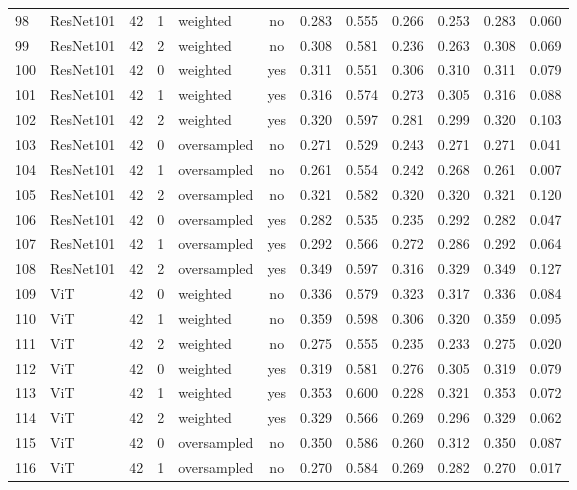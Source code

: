 \documentclass[a4paper,10pt]{book}
\begin{document}
\begin{scriptsize}
\begin{longtable}{@{}l l c c l c c c c c c c@{}}
        98 & ResNet101 & 42 & 1 & weighted & no & 0.283 & 0.555 & 0.266 & 0.253 & 0.283 & 0.060 \\ 
        99 & ResNet101 & 42 & 2 & weighted & no & 0.308 & 0.581 & 0.236 & 0.263 & 0.308 & 0.069 \\ 
        100 & ResNet101 & 42 & 0 & weighted & yes & 0.311 & 0.551 & 0.306 & 0.310 & 0.311 & 0.079 \\ 
        101 & ResNet101 & 42 & 1 & weighted & yes & 0.316 & 0.574 & 0.273 & 0.305 & 0.316 & 0.088 \\ 
        102 & ResNet101 & 42 & 2 & weighted & yes & 0.320 & 0.597 & 0.281 & 0.299 & 0.320 & 0.103 \\ 
        103 & ResNet101 & 42 & 0 & oversampled & no & 0.271 & 0.529 & 0.243 & 0.271 & 0.271 & 0.041 \\ 
        104 & ResNet101 & 42 & 1 & oversampled & no & 0.261 & 0.554 & 0.242 & 0.268 & 0.261 & 0.007 \\ 
        105 & ResNet101 & 42 & 2 & oversampled & no & 0.321 & 0.582 & 0.320 & 0.320 & 0.321 & 0.120 \\ 
        106 & ResNet101 & 42 & 0 & oversampled & yes & 0.282 & 0.535 & 0.235 & 0.292 & 0.282 & 0.047 \\ 
        107 & ResNet101 & 42 & 1 & oversampled & yes & 0.292 & 0.566 & 0.272 & 0.286 & 0.292 & 0.064 \\ 
        108 & ResNet101 & 42 & 2 & oversampled & yes & 0.349 & 0.597 & 0.316 & 0.329 & 0.349 & 0.127 \\ 
        109 & ViT & 42 & 0 & weighted & no & 0.336 & 0.579 & 0.323 & 0.317 & 0.336 & 0.084 \\ 
        110 & ViT & 42 & 1 & weighted & no & 0.359 & 0.598 & 0.306 & 0.320 & 0.359 & 0.095 \\ 
        111 & ViT & 42 & 2 & weighted & no & 0.275 & 0.555 & 0.235 & 0.233 & 0.275 & 0.020 \\ 
        112 & ViT & 42 & 0 & weighted & yes & 0.319 & 0.581 & 0.276 & 0.305 & 0.319 & 0.079 \\ 
        113 & ViT & 42 & 1 & weighted & yes & 0.353 & 0.600 & 0.228 & 0.321 & 0.353 & 0.072 \\ 
        114 & ViT & 42 & 2 & weighted & yes & 0.329 & 0.566 & 0.269 & 0.296 & 0.329 & 0.062 \\ 
        115 & ViT & 42 & 0 & oversampled & no & 0.350 & 0.586 & 0.260 & 0.312 & 0.350 & 0.087 \\ 
        116 & ViT & 42 & 1 & oversampled & no & 0.270 & 0.584 & 0.269 & 0.282 & 0.270 & 0.017 \\ 

\end{longtable}
\end{scriptsize}
\end{document}
